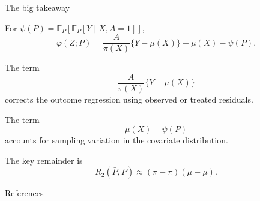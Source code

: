 \documentclass[xcolor={table}, handout]{beamer}
\newcommand{\plscbibpath}{../assets/PLSC40601}
\renewcommand{\plscbibpath}{assets/PLSC40601}%
\begin{document}
\note{
\scriptsize \singlespacing

}
\begin{frame}{The big takeaway}

\small

\begin{wideitemize}
\item For $\psi(P)=\mathbb{E}_P[\mathbb{E}_P[Y\mid X,A=1]]$,
\[
\varphi(Z;P)
  =
  \frac{A}{\pi(X)}
  \{Y-\mu(X)\}
  +
  \mu(X)-\psi(P).
\]\pause
\item The term
\[
\frac{A}{\pi(X)}\{Y-\mu(X)\}
\]
corrects the outcome regression using observed or treated residuals.\pause
\item The term
\[
\mu(X)-\psi(P)
\]
accounts for sampling variation in the covariate distribution.\pause
\item The key remainder is
\[
R_2(\bar P,P)
  \approx
  (\bar\pi-\pi)(\bar\mu-\mu).
\]
\end{wideitemize}

\end{frame}

\note{
\scriptsize \singlespacing

}
\backupbegin

\begin{frame}[allowframebreaks]{References}
    
    
\end{frame}
\backupend
\end{document}
